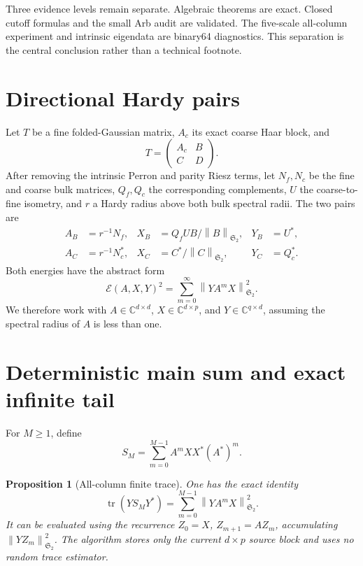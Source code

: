 \documentclass[11pt]{article}
\newtheorem{proposition}[theorem]{Proposition}
\theoremstyle{remark}
\newcommand{\C}{\mathbb C}
\newcommand{\cE}{\mathcal E}
\newcommand{\HS}{\mathfrak S_2}
\newcommand{\tr}{\operatorname{tr}}
\newcommand{\norm}[1]{\left\lVert #1\right\rVert}
\begin{document}
Three evidence levels remain separate.  Algebraic theorems are exact.
Closed cutoff formulas and the small Arb audit are validated.  The five-scale
all-column experiment and intrinsic eigendata are binary64 diagnostics.  This
separation is the central conclusion rather than a technical footnote.

\section{Directional Hardy pairs}

Let \(T\) be a fine folded-Gaussian matrix, \(A_c\) its exact coarse Haar
block, and
\[
 T=\begin{pmatrix}A_c&B\\ C&D\end{pmatrix}.
\]
After removing the intrinsic Perron and parity Riesz terms, let \(N_f,N_c\)
be the fine and coarse bulk matrices, \(Q_f,Q_c\) the corresponding
complements, \(U\) the coarse-to-fine isometry, and \(r\) a Hardy radius above
both bulk spectral radii.  The two pairs are
\begin{align*}
 A_B&=r^{-1}N_f,
 &X_B&=Q_fUB/\norm B_{\HS},
 &Y_B&=U^*,\\
 A_C&=r^{-1}N_c^*,
 &X_C&=C^*/\norm C_{\HS},
 &Y_C&=Q_c^*.
\end{align*}
Both energies have the abstract form
\begin{equation}
 \cE(A,X,Y)^2=\sum_{m=0}^{\infty}\norm{YA^mX}_{\HS}^2.
 \label{eq:energy}
\end{equation}
We therefore work with \(A\in\C^{d\times d}\),
\(X\in\C^{d\times p}\), and \(Y\in\C^{q\times d}\), assuming
the spectral radius of \(A\) is less than one.

\section{Deterministic main sum and exact infinite tail}

For \(M\ge1\), define
\begin{equation}
 S_M=\sum_{m=0}^{M-1}A^mXX^*(A^*)^m.
 \label{eq:SM}
\end{equation}

\begin{proposition}[All-column finite trace]
\label{prop:main-sum}
One has the exact identity
\begin{equation}
 \boxed{\tr(YS_MY^*)=\sum_{m=0}^{M-1}\norm{YA^mX}_{\HS}^2.}
 \label{eq:main-sum}
\end{equation}
It can be evaluated using the recurrence \(Z_0=X\), \(Z_{m+1}=AZ_m\),
accumulating \(\norm{YZ_m}_{\HS}^2\).  The algorithm stores only the current
\(d\times p\) source block and uses no random trace estimator.
\end{proposition}
\end{document}
